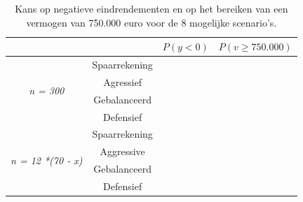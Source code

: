 \begin{table}[h]
\centering
\begin{tabular}{cc|c|c}
\multicolumn{1}{l}{}                       &               & $P(y<0)$     & $P(v\geq 750.000)$      \\ \hline
\multirow{4}{*}{\textit{n = 300}}          & Spaarrekening & \textit{} & \textit{}  \\
                                           & Agressief    & \textit{} & \textit{} \\
                                           & Gebalanceerd  & \textit{} & \textit{} \\
                                           & Defensief     & \textit{} & \textit{}  \\ \hline
\multirow{4}{*}{\textit{n = 12 *(70 - x)}} & Spaarrekening & \textit{} & \textit{}  \\
                                           & Aggressive    & \textit{} & \textit{}  \\
                                           & Gebalanceerd  & \textit{} & \textit{} \\
                                           & Defensief     & \textit{} & \textit{} 
\end{tabular}
\caption{Kans op negatieve eindrendementen en op het bereiken van een vermogen van 750.000 euro voor de 8 mogelijke scenario's.}
\label{tab:op12b}
\end{table}
